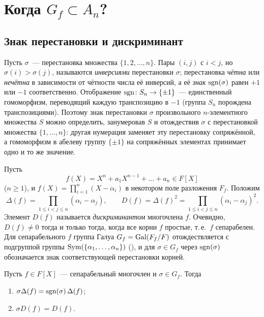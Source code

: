 \makeatletter
{}
\makeatother
\section{Когда $G_f\subset A_n$?}

\subsection*{Знак перестановки и дискриминант}

Пусть $\sigma$~--- перестановка множества $\{1,2,\dots,n\}$. Пары $(i,j)$ с $i<j$, но $\sigma(i)>\sigma(j)$, называются
\emph{инверсиями} перестановки $\sigma$; перестановка \emph{чётна} или \emph{нечётна} в зависимости от чётности числа её
инверсий, а её \emph{знак} $\operatorname{sgn}(\sigma)$ равен $+1$ или $-1$ соответственно. Отображение $\operatorname{sgn}\colon S_n\to\{\pm1\}$~---
единственный гомоморфизм, переводящий каждую транспозицию в $-1$ (группа $S_n$ порождена транспозициями). Поэтому знак
перестановки $\sigma$ произвольного $n$-элементного множества $S$ можно определить, занумеровав $S$ и отождествив
$\sigma$ с перестановкой множества $\{1,\dots,n\}$: другая нумерация заменяет эту перестановку сопряжённой, а
гомоморфизм в абелеву группу $\{\pm1\}$ на сопряжённых элементах принимает одно и то же значение.

Пусть
\[
f(X)=X^n+a_1X^{n-1}+\dots+a_n\in F[X]
\]
\textup{(}$n\ge1$\textup{)}, и $f(X)=\prod_{i=1}^n(X-\alpha_i)$ в некотором поле разложения $F_f$. Положим
\[
\Delta(f)=\prod_{1\le i<j\le n}(\alpha_i-\alpha_j),\qquad D(f)=\Delta(f)^2=\prod_{1\le i<j\le n}(\alpha_i-\alpha_j)^2 .
\]
Элемент $D(f)$ называется \emph{дискриминантом} многочлена $f$. Очевидно, $D(f)\ne0$ тогда и только тогда, когда все
корни $f$ простые, т.\,е.\ $f$ сепарабелен. Для сепарабельного $f$ группа Галуа $G_f=\operatorname{Gal}(F_f/F)$ отождествляется с
подгруппой группы $\operatorname{Sym}(\{\alpha_1,\dots,\alpha_n\})$ (), и для $\sigma\in G_f$ через $\operatorname{sgn}(\sigma)$ обозначается знак
соответствующей перестановки корней.

\begin{proposition}[4.1]
Пусть $f\in F[X]$~--- сепарабельный многочлен и $\sigma\in G_f$. Тогда
\begin{enumerate}[label=\textup{(\alph*)}]
\item $\sigma\Delta(f)=\operatorname{sgn}(\sigma)\,\Delta(f)$;
\item $\sigma D(f)=D(f)$.
\end{enumerate}
\end{proposition}

